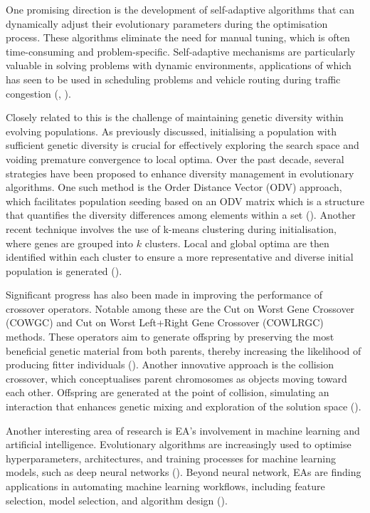 \parbreak\noindent One promising direction is the development of self-adaptive algorithms that can dynamically adjust their evolutionary parameters during the optimisation process. These algorithms eliminate the need for manual tuning, which is often time-consuming and problem-specific. Self-adaptive mechanisms are particularly valuable in solving problems with dynamic environments, applications of which has seen to be used in scheduling problems and vehicle routing during traffic congestion (\cite{dulebenets2018self}, \cite{sabar2019self}).

\parbreak\noindent Closely related to this is the challenge of maintaining genetic diversity within evolving populations. As previously discussed, initialising a population with sufficient genetic diversity is crucial for effectively exploring the search space and voiding premature convergence to local optima. Over the past decade, several strategies have been proposed to enhance diversity management in evolutionary algorithms. One such method is the Order Distance Vector (ODV) approach, which facilitates population seeding based on an ODV matrix which is a structure that quantifies the diversity differences among elements within a set (\cite{odv}). Another recent technique involves the use of k-means clustering during initialisation, where genes are grouped into $k$ clusters. Local and global optima are then identified within each cluster to ensure a more representative and diverse initial population is generated (\cite{kmeancluster}).

\parbreak\noindent Significant progress has also been made in improving the performance of crossover operators. Notable among these are the Cut on Worst Gene Crossover (COWGC) and Cut on Worst Left+Right Gene Crossover (COWLRGC) methods. These operators aim to generate offspring by preserving the most beneficial genetic material from both parents, thereby increasing the likelihood of producing fitter individuals (\cite{cowgc}). Another innovative approach is the collision crossover, which conceptualises parent chromosomes as objects moving toward each other. Offspring are generated at the point of collision, simulating an interaction that enhances genetic mixing and exploration of the solution space (\cite{newGA}).

\parbreak\noindent Another interesting area of research is EA's involvement in machine learning and artificial intelligence. Evolutionary algorithms are increasingly used to optimise hyperparameters, architectures, and training processes for machine learning models, such as deep neural networks (\cite{young2015optimizing}). Beyond neural network, EAs are finding applications in automating machine learning workflows, including feature selection, model selection, and algorithm design (\cite{nikitin2022automated}).

